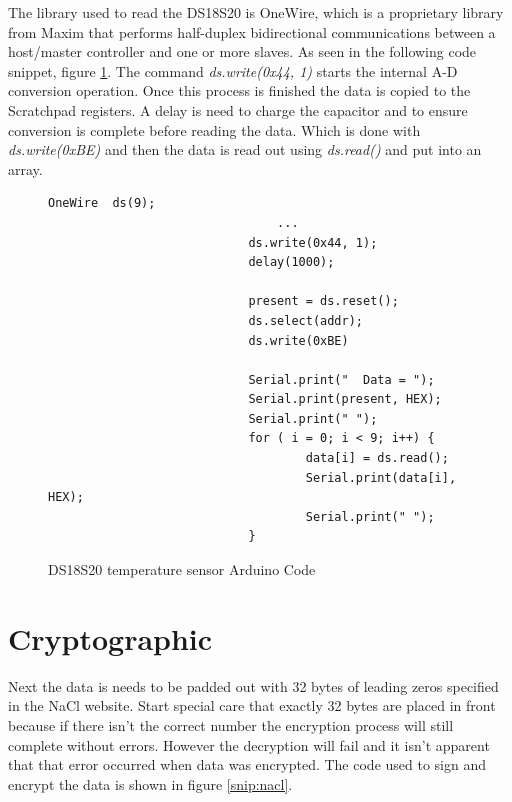 The library used to read the DS18S20 is OneWire, which is a proprietary library from Maxim that performs half-duplex bidirectional communications between a host/master controller and one or more slaves. As seen in the following code snippet, figure \ref{snip:tempcode}. The command \emph{ds.write(0x44, 1)} starts the internal A-D conversion operation. Once this process is finished the data is copied to the Scratchpad registers. A delay is need to charge the capacitor and to ensure conversion is complete before reading the data. Which is done with \emph{ds.write(0xBE)} and then the data is read out using \emph{ds.read()} and put into an array.

\begin{figure}[H]
\begin{lstlisting}[style=Arduino]
  							OneWire  ds(9);
								...
  							ds.write(0x44, 1); 
  						 	delay(1000);

  							present = ds.reset();
  							ds.select(addr);    
 							ds.write(0xBE)

  							Serial.print("  Data = "); 
  							Serial.print(present, HEX);
 						 	Serial.print(" ");
  							for ( i = 0; i < 9; i++) {          
    								data[i] = ds.read();
    								Serial.print(data[i], HEX);
    								Serial.print(" ");
  							}

\end{lstlisting}
\caption{DS18S20 temperature sensor Arduino Code}
\label{snip:tempcode}
\end{figure}


\section{Cryptographic}

Next the data is needs to be padded out with 32 bytes of leading zeros specified in the NaCl website. Start special care that exactly 32 bytes are placed in front because if there isn't the correct number the encryption process will still complete without errors. However the decryption will fail and it isn't apparent that that error occurred when data was encrypted. The code used to sign and encrypt the data is shown in figure \ref{snip:nacl}.

